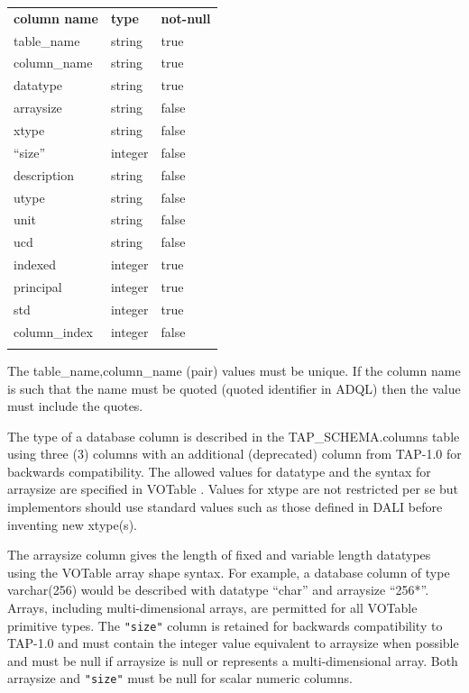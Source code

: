 \documentclass[11pt,letter]{ivoa}
\newcommand{\tapschema}{TAP\_SCHEMA}
\newcommand{\tapschema}{\mbox{%
  \relsize{-0.5}TAP\discretionary{-}{}{\kern-2pt\_}SCHEMA}}
\begin{document}
\begin{inlinetable}
\begin{tabular}{l l l}
\sptablerule
\textbf{column name} & \textbf{type} & \textbf{not-null} \\
\sptablerule
table\_name & string & true \\
column\_name & string & true \\
datatype & string & true \\
arraysize & string & false \\
xtype & string & false \\
``size'' & integer & false \\
description & string & false \\
utype & string & false \\
unit & string & false \\
ucd & string & false \\
indexed & integer & true \\
principal & integer & true \\
std & integer & true \\
column\_index & integer & false \\
\sptablerule
\end{tabular}
\end{inlinetable}

The table\_name,column\_name (pair) values must be unique. If the column name is such that 
the name must be quoted (quoted identifier in ADQL) then the value must include the quotes.

The type of a database column is described in the \tapschema.columns
table using three (3) columns with an additional (deprecated) column from TAP-1.0 
for backwards compatibility. The allowed values for datatype and the syntax for arraysize
are specified in VOTable \citep{std:VOTable}. Values for xtype are not restricted per se but 
implementors should use standard values such as those defined in DALI before 
inventing new xtype(s). 

The arraysize column gives the length of fixed and variable length datatypes using the VOTable
array shape syntax. For example, a database column of type varchar(256) would be 
described with datatype ``char'' and arraysize ``256*''. Arrays, including multi-dimensional 
arrays, are permitted for all VOTable primitive types. The \verb|"size"| column is retained for backwards
compatibility to TAP-1.0 and must contain the integer value equivalent to arraysize when 
possible and must be null if arraysize is null or represents a multi-dimensional array. Both arraysize 
and \verb|"size"| must be null for scalar numeric columns.
\end{document}
